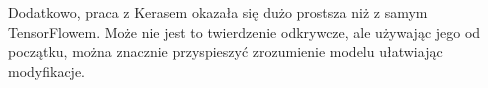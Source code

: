 \documentclass[preprint,12pt]{elsarticle}
\begin{document}
Dodatkowo, praca z Kerasem okazała się dużo prostsza niż z samym TensorFlowem. Może nie jest to twierdzenie odkrywcze, ale używając jego od początku, można znacznie przyspieszyć zrozumienie modelu ułatwiając modyfikacje. 














\end{document}
